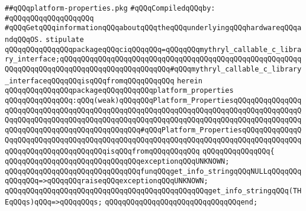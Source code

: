 \label{src/lib/std/src/nj/platform-properties.pkg}
\verb|##qQQqplatform-properties.pkg|\newline
\newline
\verb|#qQQqCompiledqQQqby:|\newline
\verb|#qQQqqQQqqQQqqQQqqQQq|\newline
\newline
\newline
\verb|#qQQqGetqQQqinformationqQQqaboutqQQqtheqQQqunderlyingqQQqhardwareqQQqandqQQqOS.|\newline
\newline
\verb|stipulate|\newline
\verb|qQQqqQQqqQQqqQQqpackageqQQqciqQQqqQQq=qQQqqQQqmythryl_callable_c_library_interface;qQQqqQQqqQQqqQQqqQQqqQQqqQQqqQQqqQQqqQQqqQQqqQQqqQQqqQQqqQQqqQQqqQQqqQQqqQQqqQQqqQQqqQQqqQQqqQQq#qQQqmythryl_callable_c_library_interfaceqQQqqQQqisqQQqfromqQQqqQQqqQQq|\newline
\verb|herein|\newline
\newline
\verb|qQQqqQQqqQQqqQQqpackageqQQqqQQqqQQqplatform_properties|\newline
\verb|qQQqqQQqqQQqqQQq:qQQq(weak)qQQqqQQqPlatform_PropertiesqQQqqQQqqQQqqQQqqQQqqQQqqQQqqQQqqQQqqQQqqQQqqQQqqQQqqQQqqQQqqQQqqQQqqQQqqQQqqQQqqQQqqQQqqQQqqQQqqQQqqQQqqQQqqQQqqQQqqQQqqQQqqQQqqQQqqQQqqQQqqQQqqQQqqQQqqQQqqQQqqQQqqQQqqQQqqQQqqQQqqQQqqQQq#qQQqPlatform_PropertiesqQQqqQQqqQQqqQQqqQQqqQQqqQQqqQQqqQQqqQQqqQQqqQQqqQQqqQQqqQQqqQQqqQQqqQQqqQQqqQQqqQQqqQQqqQQqqQQqqQQqqQQqqQQqisqQQqfromqQQqqQQqqQQq|\newline
\verb|qQQqqQQqqQQqqQQq{|\newline
\verb|qQQqqQQqqQQqqQQqqQQqqQQqqQQqqQQqexceptionqQQqUNKNOWN;|\newline
\newline
\verb|qQQqqQQqqQQqqQQqqQQqqQQqqQQqqQQqfunqQQqget_info_stringqQQqNULLqQQqqQQqqQQqqQQq=>qQQqqQQqraiseqQQqexceptionqQQqUNKNOWN;|\newline
\verb|qQQqqQQqqQQqqQQqqQQqqQQqqQQqqQQqqQQqqQQqqQQqqQQqget_info_stringqQQq(THEqQQqs)qQQq=>qQQqqQQqs;|\newline
\verb|qQQqqQQqqQQqqQQqqQQqqQQqqQQqqQQqend;|\newline
